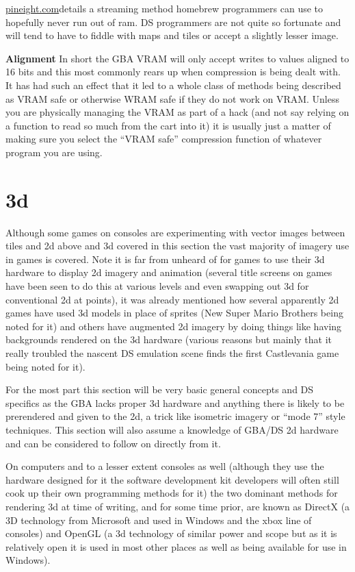 \documentclass[
]{book}
\begin{document}
\href{http://pineight.com/gba/managing-sprite-vram.txt}{pineight.com}details a streaming method homebrew programmers can use to hopefully never run out of ram. DS programmers are not quite so fortunate and will tend to have to fiddle with maps and tiles or accept a slightly lesser image.

\textbf{Alignment} In short the GBA VRAM will only accept writes to values aligned to 16 bits and this most commonly rears up when compression is being dealt with. It has had such an effect that it led to a whole class of methods being described as VRAM safe or otherwise WRAM safe if they do not work on VRAM. Unless you are physically managing the VRAM as part of a hack (and not say relying on a function to read so much from the cart into it) it is usually just a matter of making sure you select the ``VRAM safe'' compression function of whatever program you are using.

\hypertarget{d}{%
\section{3d}\label{d}}

Although some games on consoles are experimenting with vector images between tiles and 2d above and 3d covered in this section the vast majority of imagery use in games is covered. Note it is far from unheard of for games to use their 3d hardware to display 2d imagery and animation (several title screens on games have been seen to do this at various levels and even swapping out 3d for conventional 2d at points), it was already mentioned how several apparently 2d games have used 3d models in place of sprites (New Super Mario Brothers being noted for it) and others have augmented 2d imagery by doing things like having backgrounds rendered on the 3d hardware (various reasons but mainly that it really troubled the nascent DS emulation scene finds the first Castlevania game being noted for it).

For the most part this section will be very basic general concepts and DS specifics as the GBA lacks proper 3d hardware and anything there is likely to be prerendered and given to the 2d, a trick like isometric imagery or ``mode 7'' style techniques. This section will also assume a knowledge of GBA/DS 2d hardware and can be considered to follow on directly from it.

On computers and to a lesser extent consoles as well (although they use the hardware designed for it the software development kit developers will often still cook up their own programming methods for it) the two dominant methods for rendering 3d at time of writing, and for some time prior, are known as DirectX (a 3D technology from Microsoft and used in Windows and the xbox line of consoles) and OpenGL (a 3d technology of similar power and scope but as it is relatively open it is used in most other places as well as being available for use in Windows).
\end{document}
